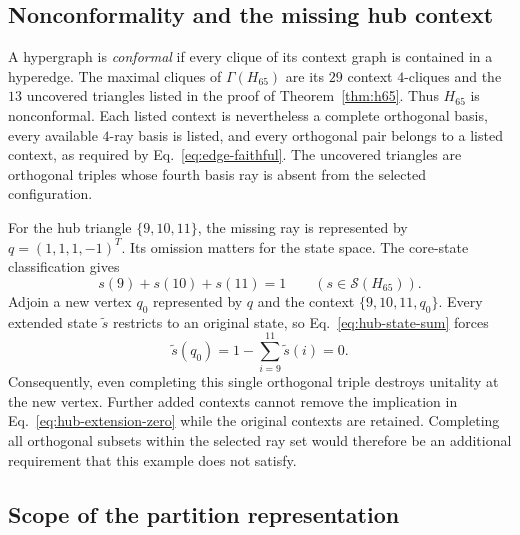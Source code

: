 \documentclass[
  aps,
  pra,
  reprint,
  superscriptaddress,
  amsmath,
  amssymb,
  nofootinbib,
  floatfix
]{revtex4-2}
\theoremstyle{definition}
\theoremstyle{remark}
\begin{document}
\subsection{Nonconformality and the missing hub context}\label{sec:nonconformality}

A hypergraph is \emph{conformal} if every clique of its context graph is contained in a hyperedge. The maximal cliques of $\Gamma(H_{65})$ are its $29$ context $4$-cliques and the $13$ uncovered triangles listed in the proof of Theorem~\ref{thm:h65}. Thus $H_{65}$ is nonconformal. Each listed context is nevertheless a complete orthogonal basis, every available $4$-ray basis is listed, and every orthogonal pair belongs to a listed context, as required by Eq.~\eqref{eq:edge-faithful}. The uncovered triangles are orthogonal triples whose fourth basis ray is absent from the selected configuration.

For the hub triangle $\{9,10,11\}$, the missing ray is represented by $q=(1,1,1,-1)^T$. Its omission matters for the state space. The core-state classification gives
\begin{equation}\label{eq:hub-state-sum}
s(9)+s(10)+s(11)=1\qquad(s\in\mathcal{S}(H_{65})).
\end{equation}
Adjoin a new vertex $q_0$ represented by $q$ and the context $\{9,10,11,q_0\}$. Every extended state $\widetilde s$ restricts to an original state, so Eq.~\eqref{eq:hub-state-sum} forces
\begin{equation}\label{eq:hub-extension-zero}
\widetilde s(q_0)=1-\sum_{i=9}^{11}\widetilde s(i)=0.
\end{equation}
Consequently, even completing this single orthogonal triple destroys unitality at the new vertex. Further added contexts cannot remove the implication in Eq.~\eqref{eq:hub-extension-zero} while the original contexts are retained. Completing all orthogonal subsets within the selected ray set would therefore be an additional requirement that this example does not satisfy.

\subsection{Scope of the partition representation}\label{sec:partition-scope}
\end{document}
